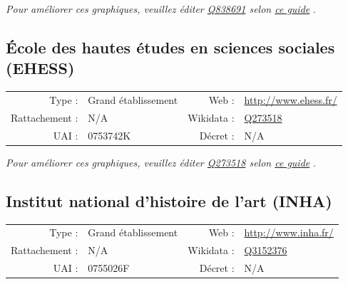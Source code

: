 \documentclass[11pt,french,landscape]{article}
\begin{document}
\textit{\scriptsize Pour améliorer ces graphiques, veuillez éditer \href{https://www.wikidata.org/entity/Q838691}{Q838691}  selon \href{https://github.com/cpesr/wikidataESR/blob/master/Rmd/wikidataESR.md}{ce guide}}
.


\newpage

\hypertarget{uxe9cole-des-hautes-uxe9tudes-en-sciences-sociales-ehess}{%
\subsection{École des hautes études en sciences sociales
(EHESS)}\label{uxe9cole-des-hautes-uxe9tudes-en-sciences-sociales-ehess}}

\begin{tabular*}{0.45\textwidth}{rp{2cm}rl}  
\hline  
Type : & Grand établissement & Web : &\href{http://www.ehess.fr/}{http://www.ehess.fr/} \\  
Rattachement : & N/A & Wikidata : & \href{https://www.wikidata.org/entity/Q273518}{Q273518} \\  
UAI : & 0753742K & Décret : & N/A \\  
\hline  
\end{tabular*}

\textit{\scriptsize Pour améliorer ces graphiques, veuillez éditer \href{https://www.wikidata.org/entity/Q273518}{Q273518}  selon \href{https://github.com/cpesr/wikidataESR/blob/master/Rmd/wikidataESR.md}{ce guide}}
.


\newpage

\hypertarget{institut-national-dhistoire-de-lart-inha}{%
\subsection{Institut national d'histoire de l'art
(INHA)}\label{institut-national-dhistoire-de-lart-inha}}

\begin{tabular*}{0.45\textwidth}{rp{2cm}rl}  
\hline  
Type : & Grand établissement & Web : &\href{http://www.inha.fr/}{http://www.inha.fr/} \\  
Rattachement : & N/A & Wikidata : & \href{https://www.wikidata.org/entity/Q3152376}{Q3152376} \\  
UAI : & 0755026F & Décret : & N/A \\  
\hline  
\end{tabular*}
\end{document}
